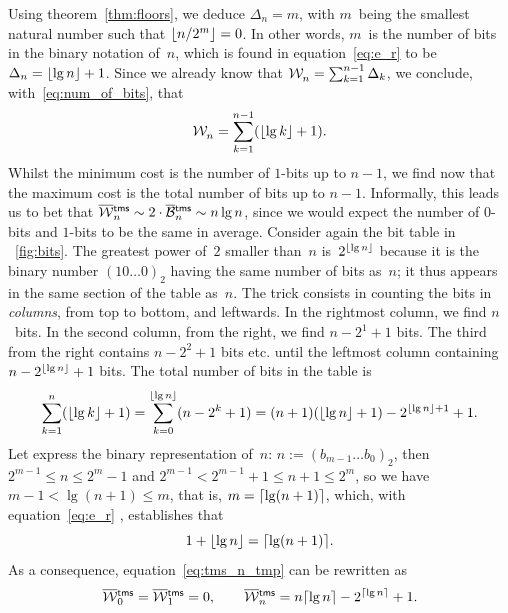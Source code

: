Using theorem~\vref{thm:floors}, we deduce \(\Delta_n = m\), with
\(m\)~being the smallest natural number such that \(\lfloor{n/2^m}\rfloor =
0\). In other words, \(m\)~is the number of bits in the binary
notation of~\(n\), which is found in equation~\eqref{eq:e_r} to be
\(\Delta_n = \lfloor{\lg n}\rfloor + 1\). Since we already know that \(\mathcal{W}_{n}^{}
= \sum_{k=1}^{n-1}\Delta_k\), we conclude,
with~\eqref{eq:num_of_bits}, that
\begin{equation}
\mathcal{W}_{n}^{} = \sum_{k=1}^{n-1}(\lfloor{\lg k}\rfloor+1).
\label{eq:tms_n_tmp}
\end{equation}
Whilst the minimum cost is the number of \(1\)-bits up to \(n-1\), we
find now that the maximum cost is the total number of bits up to
\(n-1\). Informally, this leads us to bet that \(\OW{\fun{tms}}{n}
\sim 2 \cdot \OB{\fun{tms}}{n} \sim n\lg n\), since we would expect
the number of \(0\)-bits and \(1\)-bits to be the same in
average. Consider again the bit table in \fig~\vref{fig:bits}. The
greatest power of~\(2\) smaller than~\(n\) is~\(2^{\lfloor{\lg n}\rfloor}\)
because it is the binary number \((10\dots0)_2\) having the same
number of bits as~\(n\); it thus appears in the same section of the
table as~\(n\). The trick consists in counting the bits in
\emph{columns}, from top to bottom, and leftwards. In the rightmost
column, we find \(n\)~bits. In the second column, from the right, we
find \(n-2^1+1\) bits. The third from the right contains \(n-2^2+1\)
bits etc. until the leftmost column containing \(n-2^{\lfloor{\lg
    n}\rfloor}+1\) bits. The total number of bits in the table is
\begin{equation*}
\sum_{k=1}^{n}{\!(\lfloor{\lg k}\rfloor+1)}
   = \sum_{k=0}^{\lfloor{\lg n}\rfloor}{\!(n-2^k+1)}
   = (n + 1)(\lfloor{\lg n}\rfloor + 1) - 2^{\lfloor{\lg n}\rfloor+1} + 1.
\end{equation*}
Let express the binary representation of~\(n\): \(n := (b_{m-1}\dots
b_0)_2\), then \(2^{m-1} \leqslant n \leqslant 2^m - 1\) and \(2^{m-1}
< 2^{m-1} + 1 \leqslant n + 1 \leqslant 2^m\), so we have \(m-1 <
\lg(n+1) \leqslant m\), that is, \(m = \lceil{\lg(n+1)}\rceil\), which,
with equation~\eqref{eq:e_r} , establishes that
\begin{equation*}
  1 + \lfloor{\lg n}\rfloor = \lceil{\lg(n+1)}\rceil.
\end{equation*}
As a consequence, equation~\eqref{eq:tms_n_tmp} can be rewritten as
\begin{equation}
\OW{\fun{tms}}{0} = \OW{\fun{tms}}{1} = 0,
\qquad
\OW{\fun{tms}}{n} = n\ceiling{\lg n} - 2^{\ceiling{\lg n}} + 1.
\label{eq:top}
\end{equation}
